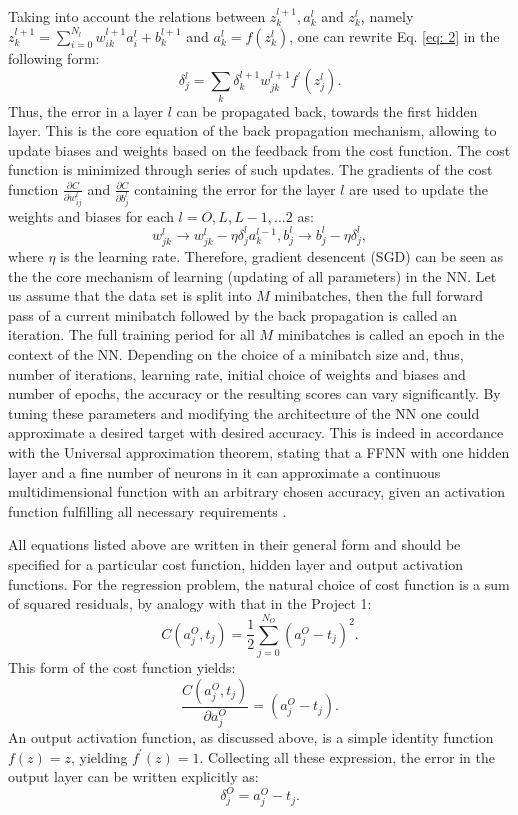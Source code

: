 \documentclass{emulateapj}
\begin{document}
Taking into account the relations between $z_{k}^{l+1}, a_{k}^{l}$ and $z_{k}^{l}$, namely  $z_{k}^{l+1}=\sum_{i=0}^{N_l}w_{ik}^{l+1}a_i^l+b^{l+1}_k$ and $a_{k}^{l}=f(z_{k}^{l})$, one can rewrite Eq. \ref{eq: 2} in the following form:
\begin{equation}
    \delta_j^l=\sum_k \delta_k^{l+1} w_{jk}^{l+1}f^{\prime}(z_j^l).
\end{equation}
Thus, the error in a layer $l$ can be propagated back, towards the first hidden layer. This is the core equation of the back propagation mechanism, allowing to update biases and weights based on the feedback from the cost function. The cost function is minimized through series of such updates. The gradients of the cost function $\frac{\partial C}{\partial w_{ij}^l}$ and $\frac{\partial C}{\partial b_{j}^l}$ containing the error for the layer $l$ are used to update the weights and biases for each $l=O, L, L-1, ...2$ as:
\begin{equation}
    w^l_{jk}\rightarrow w_{jk}^l-\eta\delta_j^la_k^{l-1},
    b_j^l\rightarrow b_j^l-\eta\delta_j^l,
\end{equation}
where $\eta$ is the learning rate. Therefore,  gradient desencent (SGD) can be seen as the the core mechanism of learning (updating of all parameters) in the NN. Let us assume that the data set is split into $M$
minibatches, then the full forward pass of a current minibatch followed by the back propagation is called an iteration. The full training period for all $M$ minibatches is called an epoch in the context of the NN. Depending on the choice of a minibatch size and, thus, number of iterations, learning rate, initial choice of weights and biases and number of epochs, the accuracy or the resulting scores can vary significantly. By tuning these parameters and modifying the architecture of the NN one could approximate a desired target with desired accuracy. This is indeed in accordance with the Universal approximation theorem, stating that a FFNN with one hidden layer and a fine number of neurons in it can approximate a continuous multidimensional function with an arbitrary chosen accuracy, given an activation function fulfilling all necessary requirements \cite{Morten}. 

All equations listed above are written in their general form and should be specified for a particular cost function, hidden layer and output activation functions. For the regression problem, the natural choice of cost function is a sum of squared residuals, by analogy with that in the Project 1:
\begin{equation}
    C(a_j^O, t_j)=\frac{1}{2}\sum_{j=0}^{N_O}(a_j^O-t_j)^2.
\end{equation}
 This form of the cost function yields:
 \begin{equation}
     \frac{C(a_j^O, t_j)}{\partial a_{j}^O}=(a_{j}^O-t_j).
 \end{equation}
 An output activation function, as discussed above, is a simple identity function $f(z)=z$, yielding $f^{\prime}(z)=1$. Collecting all these expression, the error in the output layer can be written explicitly as:
 \begin{equation}
     \delta_j^O = a_{j}^O-t_j.
 \end{equation}
 
\end{document}
